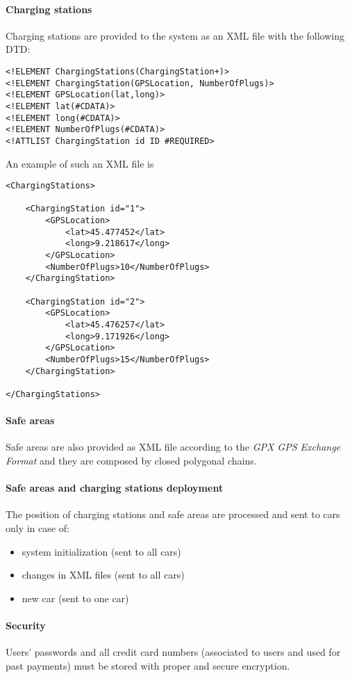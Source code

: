 \paragraph{Charging stations}Charging stations are provided to the system as an XML file with the following DTD:
\lstset{language=XML,frame=false}
\begin{lstlisting}
<!ELEMENT ChargingStations(ChargingStation+)>
<!ELEMENT ChargingStation(GPSLocation, NumberOfPlugs)>
<!ELEMENT GPSLocation(lat,long)>
<!ELEMENT lat(#CDATA)>
<!ELEMENT long(#CDATA)>
<!ELEMENT NumberOfPlugs(#CDATA)>
<!ATTLIST ChargingStation id ID #REQUIRED>
\end{lstlisting}
An example of such an XML file is 
\begin{lstlisting}
<ChargingStations>

	<ChargingStation id="1">
		<GPSLocation>
			<lat>45.477452</lat>
			<long>9.218617</long>
		</GPSLocation>
		<NumberOfPlugs>10</NumberOfPlugs>
	</ChargingStation>
	
	<ChargingStation id="2">
		<GPSLocation>
			<lat>45.476257</lat>
			<long>9.171926</long>
		</GPSLocation>
		<NumberOfPlugs>15</NumberOfPlugs>
	</ChargingStation>
	
</ChargingStations>
\end{lstlisting}

\paragraph{Safe areas}Safe areas are also provided as XML file according to the \emph{GPX GPS Exchange Format} \cite{gpx} and they are composed by closed polygonal chains.

\paragraph{Safe areas and charging stations deployment}The position of charging stations and safe areas are processed and sent to cars only in case of:
\begin{itemize}
	\item system initialization (sent to all cars)
	\item changes in XML files (sent to all cars)
	\item new car (sent to one car)
\end{itemize}

\paragraph{Security}Users' passwords and all credit card numbers (associated to users and used for past payments) must be stored with proper and secure encryption.

